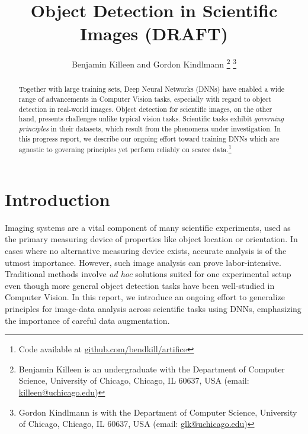 \documentclass[10pt, journal]{IEEEtran}
\title{Object Detection in Scientific Images (DRAFT)}
\author{Benjamin Killeen and Gordon Kindlmann %
  \thanks{Benjamin Killeen is an undergraduate with the Department of Computer
    Science, University of Chicago, Chicago, IL 60637, USA (email:
    \href{mailto:killeen@uchicago.edu}{killeen@uchicago.edu})} %
  \thanks{Gordon Kindlmann is with the Department of Computer Science, 
    University of Chicago, Chicago, IL 60637, USA (email:
    \href{mailto:glk@uchicago.edu}{glk@uchicago.edu})} %
}
\begin{document}
\maketitle

\begin{abstract}
  Together with large training sets, Deep Neural Networks (DNNs) have enabled a
  wide range of advancements in Computer Vision tasks, especially with regard to
  object detection in real-world images. Object detection for scientific images,
  on the other hand, presents challenges unlike typical vision tasks. Scientific
  tasks exhibit \emph{governing principles} in their datasets, which result from
  the phenomena under investigation. In this progress report, we describe our
  ongoing effort toward training DNNs which are agnostic to governing principles
  yet perform reliably on scarce data.\footnote{Code available at
    \href{https://github.com/bendkill/artifice} {github.com/bendkill/artifice}}
\end{abstract}

\section{Introduction}
\label{sec:introduction}



Imaging systems are a vital component of many scientific experiments, used as
the primary measuring device of properties like object location or
orientation. In cases where no alternative measuring device exists, accurate
analysis is of the utmost importance. However, such image analysis can prove
labor-intensive. Traditional methods involve \emph{ad hoc} solutions suited for
one experimental setup even though more general object detection tasks have been
well-studied in Computer Vision. In this report, we introduce an ongoing effort
to generalize principles for image-data analysis across scientific tasks using
DNNs, emphasizing the importance of careful data augmentation.
\end{document}
